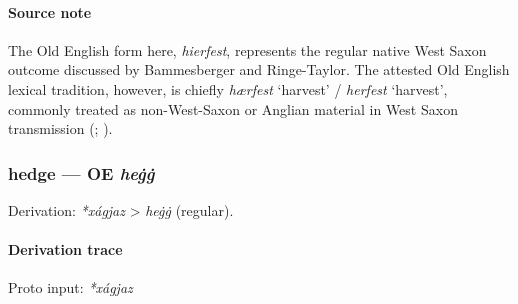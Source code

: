 \documentclass[
  british,
  a4paper,
]{article}
\begin{document}
\paragraph{Source note}\label{source-note-2}

The Old English form here, \emph{hierfest}, represents the regular
native West Saxon outcome discussed by Bammesberger and Ringe-Taylor.
The attested Old English lexical tradition, however, is chiefly
\emph{hærfest} `harvest' / \emph{herfest} `harvest', commonly treated as
non-West-Saxon or Anglian material in West Saxon transmission
(;
).

\subsubsection{\texorpdfstring{hedge --- OE
\emph{heġġ}}{hedge --- OE heġġ}}\label{hedge-oe-heux121ux121}

Derivation: \emph{*xágjaz} \textgreater{} \emph{heġġ} (regular).

\paragraph{Derivation trace}\label{derivation-trace-33}

Proto input: \emph{*xágjaz}

\begingroup
\setlength{\fboxsep}{6pt}
\end{document}
